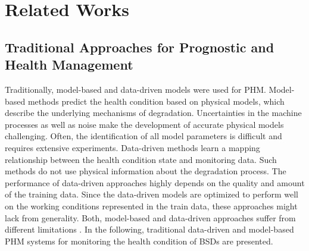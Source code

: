 
\chapter{Related Works}\label{chapter:related_works}


\section{Traditional Approaches for Prognostic and Health Management}\label{sec:traditional_approaches}

Traditionally, model-based and data-driven models were used for PHM. Model-based methods predict the health condition based on physical models, which describe the underlying mechanisms of degradation. Uncertainties in the machine processes as well as noise make the development of accurate physical models challenging. Often, the identification of all model parameters is difficult and requires extensive experiments. Data-driven methods learn a mapping relationship between the health condition state and monitoring data. Such methods do not use physical information about the degradation process. The performance of data-driven approaches highly depends on the quality and amount of the training data. Since the data-driven models are optimized to perform well on the working conditions represented in the train data, these approaches might lack from generality. Both, model-based and data-driven approaches suffer from different limitations \cite{DENG2020}. In the following, traditional data-driven and model-based PHM systems for monitoring the health condition of BSDs are presented.

